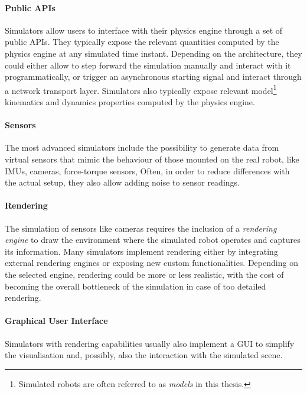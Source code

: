 \paragraph{Public APIs}

Simulators allow users to interface with their physics engine through a set of public \acp{API}.
They typically expose the relevant quantities computed by the physics engine at any simulated time instant.
Depending on the architecture, they could either allow to step forward the simulation manually and interact with it programmatically, or trigger an asynchronous starting signal and interact through a network transport layer.
Simulators also typically expose relevant model\footnote{Simulated robots are often referred to as \emph{models} in this thesis.} kinematics and dynamics properties computed by the physics engine.

\paragraph{Sensors}

The most advanced simulators include the possibility to generate data from virtual sensors that mimic the behaviour of those mounted on the real robot, like \acp{IMU}, cameras, force-torque sensors, \etc
Often, in order to reduce differences with the actual setup, they also allow adding noise to sensor readings.

\paragraph{Rendering}

The simulation of sensors like cameras requires the inclusion of a \emph{rendering engine} to draw the environment where the simulated robot operates and captures its information.
Many simulators implement rendering either by integrating external rendering engines or exposing new custom functionalities.
Depending on the selected engine, rendering could be more or less realistic, with the cost of becoming the overall bottleneck of the simulation in case of too detailed rendering.

\paragraph{Graphical User Interface}

Simulators with rendering capabilities usually also implement a \ac{GUI} to simplify the visualisation and, possibly, also the interaction with the simulated scene.

